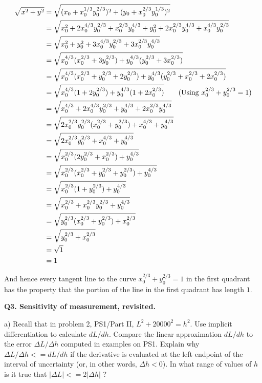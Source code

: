 \documentclass[9pt]{article}
\begin{document}
\begin{align*}
  \sqrt{x^2 + y^2} &= \sqrt{(x_0 + x_0^{1/3} y_0^{2/3})^2 + (y_0 + x_0^{2/3} y_0^{1/3})^2} \\
                   &= \sqrt{x_0^2 + 2x_0^{4/3}y_0^{2/3} + x_0^{2/3} y_0^{4/3} + y_0^2 + 2x_0^{2/3}y_0^{4/3} + x_0^{4/3}y_0^{2/3}} \\
                   &= \sqrt{x_0^2 + y_0^2 + 3x_0^{4/3}y_0^{2/3} + 3x_0^{2/3}y_0^{4/3}} \\
                   &= \sqrt{x_0^{4/3} (x_0^{2/3} + 3y_0^{2/3}) + y_0^{4/3} (y_0^{2/3} + 3x_0^{2/3})} \\
                   &= \sqrt{x_0^{4/3} (x_0^{2/3} + y_0^{2/3} + 2y_0^{2/3}) + y_0^{4/3} (y_0^{2/3} + x_0^{2/3} + 2x_0^{2/3})} \\
                   &= \sqrt{x_0^{4/3} (1 + 2y_0^{2/3}) + y_0^{4/3} (1 + 2x_0^{2/3})} \tag*{(Using $x_0^{2/3} + y_0^{2/3} = 1$)} \\
                   &= \sqrt{x_0^{4/3} + 2x_0^{4/3}y_0^{2/3} + y_0^{4/3} + 2x_0^{2/3}y_0^{4/3}} \\
                   &= \sqrt{2x_0^{2/3}y_0^{2/3} (x_0^{2/3} + y_0^{2/3}) + x_0^{4/3} + y_0^{4/3}} \\
                   &= \sqrt{2x_0^{2/3}y_0^{2/3} + x_0^{4/3} + y_0^{4/3}} \\
                   &= \sqrt{x_0^{2/3} (2y_0^{2/3} + x_0^{2/3}) + y_0^{4/3}} \\
                   &= \sqrt{x_0^{2/3} (x_0^{2/3} + y_0^{2/3} + y_0^{2/3}) + y_0^{4/3}} \\
                   &= \sqrt{x_0^{2/3} (1 + y_0^{2/3}) + y_0^{4/3}} \\
                   &= \sqrt{x_0^{2/3} + x_0^{2/3}y_0^{2/3} + y_0^{4/3}} \\
                   &= \sqrt{y_0^{2/3} (x_0^{2/3} + y_0^{2/3}) + x_0^{2/3}} \\
                   &= \sqrt{y_0^{2/3} + x_0^{2/3}} \\
                   &= \sqrt{1} \\
                   &= 1
\end{align*}

And hence every tangent line to the curve $x_0^{2/3} + y_0^{2/3} = 1$ in the first quadrant has the property that the portion of the line in the first quadrant has length $1$.

\begin{tcolorbox}
  \textbf{Q3. Sensitivity of measurement, revisited.}

  a) Recall that in problem 2, PS1/Part II, $L^2 + 20000^2 = h^2$. Use implicit differentiation to calculate $dL/dh$. Compare the linear approximation $dL/dh$ to the error $\Delta L / \Delta h$ computed in examples on PS1. Explain why $ \Delta L / \Delta h <= dL/dh $ if the derivative is evaluated at the left endpoint of the interval of uncertainty (or, in other words, $\Delta h < 0$). In what range of values of $h$ is it true that $|\Delta L| <= 2|\Delta h|$ ?
\end{tcolorbox}
\end{document}
